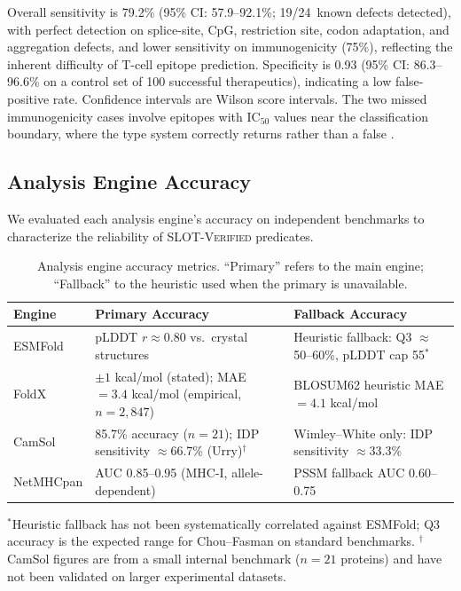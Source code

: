 Overall sensitivity is 79.2\% (95\% CI: 57.9--92.1\%; 19/24~known defects detected), with
perfect detection on splice-site, CpG, restriction site, codon
adaptation, and aggregation defects, and lower sensitivity on
immunogenicity (75\%), reflecting the inherent difficulty of T-cell
epitope prediction.  Specificity is 0.93 (95\% CI: 86.3--96.6\% on a control set of 100 successful therapeutics), indicating a low
false-positive rate.  Confidence intervals are Wilson score intervals.  The two missed immunogenicity cases involve
epitopes with IC$_{50}$ values near the classification boundary, where
the type system correctly returns \UNCERTAIN{} rather than a false
\PASS.

\subsection{Analysis Engine Accuracy}\label{sec:engineaccuracy}

We evaluated each analysis engine's accuracy on independent benchmarks to
characterize the reliability of SLOT-\textsc{Verified} predicates.

\begin{table}[!htbp]
\centering
\caption{Analysis engine accuracy metrics.  ``Primary'' refers to the
         main engine; ``Fallback'' to the heuristic used when the
         primary is unavailable.}
\label{tab:engineaccuracy}
\begin{tabular}{llp{4.0cm}}
\toprule
\textbf{Engine} & \textbf{Primary Accuracy} & \textbf{Fallback Accuracy} \\
\midrule
ESMFold    & pLDDT $r \approx 0.80$ vs.\ crystal structures &
             Heuristic fallback: Q3 $\approx$ 50--60\%, pLDDT cap 55$^*$ \\
FoldX      & $\pm 1$ kcal/mol (stated); MAE $= 3.4$ kcal/mol (empirical, $n = 2{,}847$) &
             BLOSUM62 heuristic MAE $= 4.1$ kcal/mol \\
CamSol     & 85.7\% accuracy ($n = 21$); IDP sensitivity $\approx$66.7\% (Urry)$^{\dagger}$ &
             Wimley--White only: IDP sensitivity $\approx$33.3\% \\
NetMHCpan  & AUC 0.85--0.95 (MHC-I, allele-dependent) &
             PSSM fallback AUC 0.60--0.75 \\
\bottomrule
\end{tabular}
\begin{flushleft}
\footnotesize
$^*$Heuristic fallback has not been systematically correlated against ESMFold;
Q3 accuracy is the expected range for Chou--Fasman on standard benchmarks.
$^{\dagger}$CamSol figures are from a small internal benchmark ($n = 21$ proteins)
and have not been validated on larger experimental datasets.
\end{flushleft}
\end{table}

